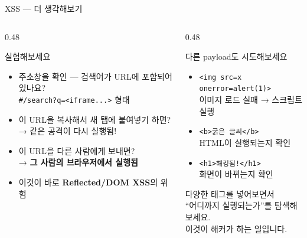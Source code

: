 \documentclass[aspectratio=169,10pt]{beamer}
\newcommand{\hlt}[1]{\textcolor{accent}{\textbf{#1}}}
\begin{document}
\begin{frame}{XSS — 더 생각해보기}

\begin{columns}[T]
\begin{column}{0.48\textwidth}
\begin{exampleblock}{실험해보세요}
\begin{itemize}
    \item 주소창을 확인 — 검색어가 URL에 포함되어 있나요?\\
          {\footnotesize \texttt{\#/search?q=<iframe...>} 형태}
    \item 이 URL을 복사해서 새 탭에 붙여넣기 하면?\\
          → 같은 공격이 다시 실행됨!
    \item 이 URL을 다른 사람에게 보내면?\\
          → \hlt{그 사람의 브라우저에서 실행됨}
    \item 이것이 바로 \textbf{Reflected/DOM XSS}의 위험
\end{itemize}
\end{exampleblock}
\end{column}
\begin{column}{0.48\textwidth}
\begin{block}{다른 payload도 시도해보세요}
\begin{itemize}
    \item \texttt{<img src=x onerror=alert(1)>}\\
          {\footnotesize 이미지 로드 실패 → 스크립트 실행}
    \item \texttt{<b>굵은 글씨</b>}\\
          {\footnotesize HTML이 실행되는지 확인}
    \item \texttt{<h1>해킹됨!</h1>}\\
          {\footnotesize 화면이 바뀌는지 확인}
\end{itemize}

\vspace{0.3em}
{\footnotesize 다양한 태그를 넣어보면서\\``어디까지 실행되는가''를 탐색해보세요.\\이것이 해커가 하는 일입니다.}
\end{block}
\end{column}
\end{columns}
\end{frame}

\end{document}
